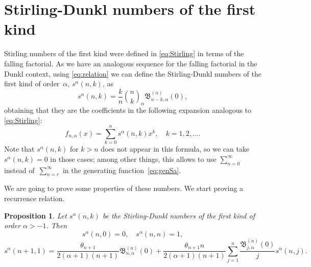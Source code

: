\documentclass[11pt,a4paper]{article}
\theoremstyle{plain}
\newtheorem{proposition}[theorem]{Proposition}
\theoremstyle{remark}
\newcommand{\binoma}[2]{\binom{#1}{#2}_{\!\alpha}}
\newcommand{\B}{\mathfrak{B}}
\begin{document}
\section{Stirling-Dunkl numbers of the first kind}
\label{sec:S-D-first}


Stirling numbers of the first kind were defined in \eqref{eq:Stirling} in terms of the falling factorial.
As we have an analogous sequence for the falling factorial in the Dunkl context, using \eqref{eq:relation} we can define the Stirling-Dunkl numbers of the first kind of order~$\alpha$, $s^{\alpha}(n,k)$, as 
\begin{equation}
\label{eq:def-S-D}
  s^{\alpha}(n,k) = \frac{k}{n} \binoma{n}{k} \B_{n-k,\alpha}^{(n)}(0),
\end{equation}
obtaining that they are the coefficients in the following expansion analogous to \eqref{eq:Stirling}: 
\begin{equation}
\label{eq:Stirling-Dunkl}
    f_{n,\alpha}(x) = \sum_{k=0}^n s^{\alpha}(n,k)x^k,
  \quad k = 1,2,\ldots.
\end{equation}
Note that $s^{\alpha}(n,k)$ for $k>n$ does not appear in this formula, so we can take $s^{\alpha}(n,k) = 0$ in those cases; among other things, this allows to use $\sum_{n=0}^{\infty}$ instead of~$\sum_{n=r}^{\infty}$ in the generating function~\eqref{eq:genSa}.

We are going to prove some properties of these numbers. We start proving a recurrence relation. 

\begin{proposition}
\label{prop:S-D}
Let $s^{\alpha}(n,k)$ be the Stirling-Dunkl numbers of the first kind of order $\alpha>-1$. Then 
\begin{equation}
\label{eq:S-D-0}
  s^{\alpha}(n,0)=0,\quad s^{\alpha}(n,n)=1,
\end{equation}
\begin{equation}
\label{eq:S-D-n+1}
  s^{\alpha}(n+1,1) = \frac{\theta_{n+1}}{2(\alpha+1)(n+1)} 
  \B_{n,\alpha}^{(n)}(0) + \frac{\theta_{n+1}n}{2(\alpha+1)(n+1)}
  \sum_{j=1}^n \frac{\B_{j,\alpha}^{(n)}(0)}{j} s^{\alpha}(n,j).
\end{equation}
\end{proposition}
\end{document}
